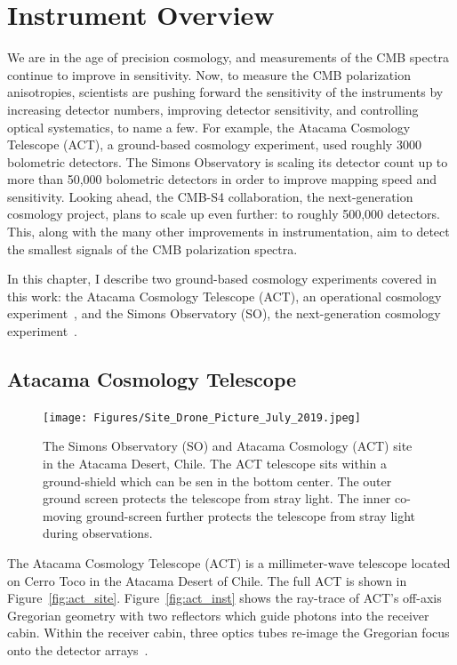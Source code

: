 \chapter{Instrument Overview}
\label{ch:instruments}

We are in the age of precision cosmology, and measurements of the CMB spectra continue to improve in sensitivity.  Now, to measure the CMB polarization anisotropies, scientists are pushing forward the sensitivity of the instruments by increasing detector numbers, improving detector sensitivity, and controlling optical systematics, to name a few.  For example, the Atacama Cosmology Telescope (ACT), a ground-based cosmology experiment, used roughly 3000 bolometric detectors.  The Simons Observatory is scaling its detector count up to more than 50,000 bolometric detectors in order to improve mapping speed and sensitivity.  Looking ahead, the CMB-S4 collaboration, the next-generation cosmology project, plans to scale up even further: to roughly 500,000 detectors.  This, along with the many other improvements in instrumentation, aim to detect the smallest signals of the CMB polarization spectra.

In this chapter, I describe two ground-based cosmology experiments covered in this work: the Atacama Cosmology Telescope (ACT), an operational cosmology experiment~\cite{act_inst}, and the Simons Observatory (SO), the next-generation cosmology experiment~\cite{so19}. 

\section{Atacama Cosmology Telescope}
\begin{figure}[ht]
    \centering
    \texttt{[image: Figures/Site\_Drone\_Picture\_July\_2019.jpeg]}
    \caption{The Simons Observatory (SO) and Atacama Cosmology (ACT) site in the Atacama Desert, Chile. The ACT telescope sits within a ground-shield which can be sen in the bottom center.  The outer ground screen protects the telescope from stray light.  The inner co-moving ground-screen further protects the telescope from stray light during observations.}
    \label{fig:act_so_site}
\end{figure}

The Atacama Cosmology Telescope (ACT) is a millimeter-wave telescope located on Cerro Toco in the Atacama Desert of Chile.  The full ACT is shown in Figure~\ref{fig:act_site}.  Figure~\ref{fig:act_inst} shows the ray-trace of ACT's off-axis Gregorian geometry with two reflectors which guide photons into the receiver cabin.  Within the receiver cabin, three optics tubes re-image the Gregorian focus onto the detector arrays~\cite{thornton_2016}.

